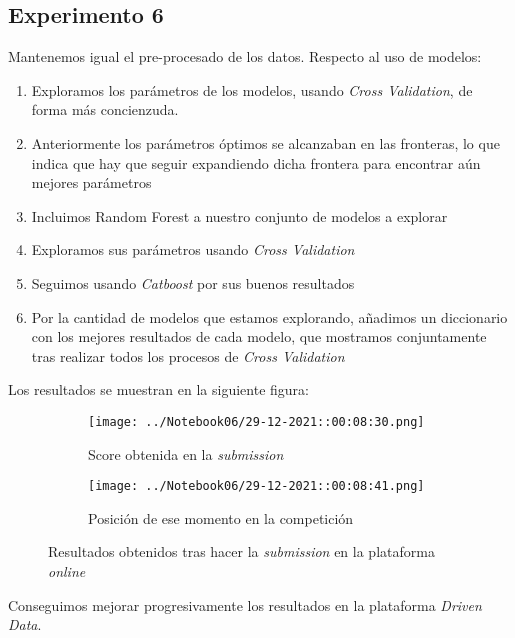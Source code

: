 \documentclass[11pt]{article}
\begin{document}
\pagebreak

\subsection{Experimento 6}

Mantenemos igual el pre-procesado de los datos. Respecto al uso de modelos:

\begin{enumerate}
    \item Exploramos los parámetros de los modelos, usando \emph{Cross Validation}, de forma más concienzuda.
    \item Anteriormente los parámetros óptimos se alcanzaban en las fronteras, lo que indica que hay que seguir expandiendo dicha frontera para encontrar aún mejores parámetros
    \item Incluimos Random Forest a nuestro conjunto de modelos a explorar
    \item Exploramos sus parámetros usando \emph{Cross Validation}
    \item Seguimos usando \emph{Catboost} por sus buenos resultados
    \item Por la cantidad de modelos que estamos explorando, añadimos un diccionario con los mejores resultados de cada modelo, que mostramos conjuntamente tras realizar todos los procesos de \emph{Cross Validation}
\end{enumerate}

Los resultados se muestran en la siguiente figura:

\begin{figure}[H]
    \centering

    \begin{subfigure}[b]{0.45 \textwidth}
        \texttt{[image: ../Notebook06/29-12-2021::00:08:30.png]}
        \caption{Score obtenida en la \emph{submission}}
    \end{subfigure}
    \begin{subfigure}[b]{0.45 \textwidth}
        \texttt{[image: ../Notebook06/29-12-2021::00:08:41.png]}
        \caption{Posición de ese momento en la competición}
    \end{subfigure}

    \caption{Resultados obtenidos tras hacer la \emph{submission} en la plataforma \emph{online}}
\end{figure}

Conseguimos mejorar progresivamente los resultados en la plataforma \emph{Driven Data}.
\end{document}
